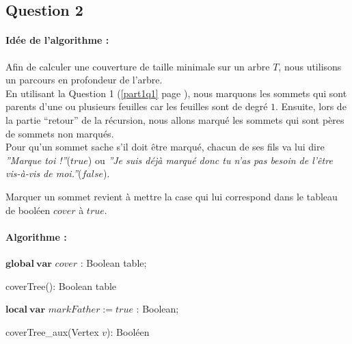   \subsection{Question 2}
  
    \paragraph{Idée de l'algorithme :\\}
    Afin de calculer une couverture de taille minimale sur un arbre $T$,
    nous utilisons un parcours en profondeur de l'arbre.\\
    En utilisant la Question 1 (\ref{part1q1} page \pageref{part1q1}),
    nous marquons les sommets qui sont parents d'une ou plusieurs
    feuilles car les feuilles sont de degré $1$. Ensuite, lors de la
    partie ``retour'' de la récursion, nous allons marqué les sommets
    qui sont pères de sommets non marqués.\\

    Pour qu'un sommet sache s'il doit être marqué, chacun de ses fils va
    lui dire \emph{''Marque toi !''}($true$) ou \emph{''Je suis déjà
    marqué donc tu n'as pas besoin de l'être vis-à-vis de
    moi.''}($false$).

    Marquer un sommet revient à mettre la case qui lui correspond dans
    le tableau de booléen $cover$ à $true$.

    \paragraph{Algorithme :\\}
    \begin{algorithm}
     \SetLine
     $\mathbf{global~var}$ $cover$ : Boolean table;\\
     \caption{coverTree(): Boolean table}
    \end{algorithm}

    \begin{algorithm}
     \SetLine
     $\mathbf{local~var}$ $markFather := true$ : Boolean;\\
     \caption{coverTree\_aux(Vertex $v$): Booléen}
    \end{algorithm}
     
